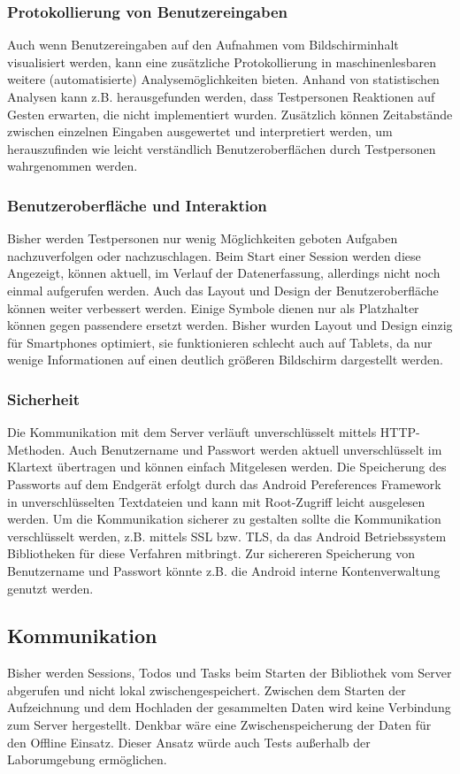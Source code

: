 \subsubsection{Protokollierung von Benutzereingaben}
Auch wenn Benutzereingaben auf den Aufnahmen vom Bildschirminhalt visualisiert werden, kann eine zusätzliche Protokollierung in maschinenlesbaren weitere (automatisierte) Analysemöglichkeiten bieten.
Anhand von statistischen Analysen kann z.B. herausgefunden werden, dass Testpersonen Reaktionen auf Gesten erwarten, die nicht implementiert wurden.
Zusätzlich können Zeitabstände zwischen einzelnen Eingaben ausgewertet und interpretiert werden, um herauszufinden wie leicht verständlich Benutzeroberflächen durch Testpersonen wahrgenommen werden.

\subsubsection{Benutzeroberfläche und Interaktion}
Bisher werden Testpersonen nur wenig Möglichkeiten geboten Aufgaben nachzuverfolgen oder nachzuschlagen.
Beim Start einer Session werden diese Angezeigt, können aktuell, im Verlauf der Datenerfassung, allerdings nicht noch einmal aufgerufen werden.
Auch das Layout und Design der Benutzeroberfläche können weiter verbessert werden.
Einige Symbole dienen nur als Platzhalter können gegen passendere ersetzt werden.
Bisher wurden Layout und Design einzig für Smartphones optimiert, sie funktionieren schlecht auch auf Tablets, da nur wenige Informationen auf einen deutlich größeren Bildschirm dargestellt werden.

\subsubsection{Sicherheit}
Die Kommunikation mit dem Server verläuft unverschlüsselt mittels \ac{HTTP}-Methoden.
Auch Benutzername und Passwort werden aktuell unverschlüsselt im Klartext übertragen und können einfach Mitgelesen werden.
Die Speicherung des Passworts auf dem Endgerät erfolgt durch das Android Pereferences Framework in unverschlüsselten Textdateien und kann mit Root-Zugriff leicht ausgelesen werden.  
Um die Kommunikation sicherer zu gestalten sollte die Kommunikation verschlüsselt werden, z.B. mittels \ac{SSL} bzw. \ac{TLS}, da das Android Betriebssystem Bibliotheken für diese Verfahren mitbringt.
Zur sichereren Speicherung von Benutzername und Passwort könnte z.B. die Android interne Kontenverwaltung genutzt werden.

\subsection{Kommunikation}
Bisher werden Sessions, Todos und Tasks beim Starten der Bibliothek vom Server abgerufen und nicht lokal zwischengespeichert. 
Zwischen dem Starten der Aufzeichnung und dem Hochladen der gesammelten Daten wird keine Verbindung zum Server hergestellt.
Denkbar wäre eine Zwischenspeicherung der Daten für den Offline Einsatz.
Dieser Ansatz würde auch Tests außerhalb der Laborumgebung ermöglichen.
